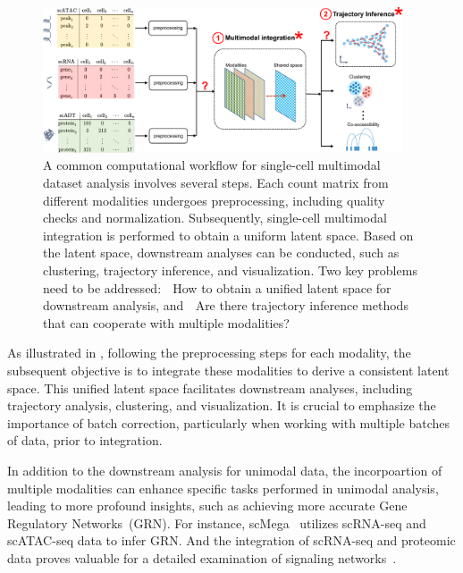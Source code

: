 \begin{figure}[!ht]
	\centering
	\includegraphics[width=0.95\textwidth]{workflow_multimodal/fig}
	\vspace{0.1cm}
	\caption[A common computational multimodal analysis workflow.]{A common computational workflow for single-cell multimodal dataset analysis involves several steps. Each count matrix from different modalities undergoes preprocessing, including quality checks and normalization. Subsequently, single-cell multimodal integration is performed to obtain a uniform latent space. Based on the latent space, downstream analyses can be conducted, such as clustering, trajectory inference, and visualization. Two key problems need to be addressed: \textcircled{} How to obtain a unified latent space for downstream analysis, and \textcircled{} Are there trajectory inference methods that can cooperate with multiple modalities?}
	\label{fig:workflow_multimodal}
\end{figure}


	As illustrated in , following the preprocessing steps for each modality, the subsequent objective is to integrate these modalities to derive a consistent latent space. This unified latent space facilitates downstream analyses, including trajectory analysis, clustering, and visualization. It is crucial to emphasize the importance of batch correction, particularly when working with multiple batches of data, prior to integration.

	In addition to the downstream analysis for unimodal data, the incorpoartion of multiple modalities can enhance specific tasks performed in unimodal analysis, leading to more profound insights, such as achieving more accurate Gene Regulatory Networks~(GRN). For instance, scMega~\citep{li2023scmega} utilizes scRNA-seq and scATAC-seq data to infer GRN. And the integration of scRNA-seq and proteomic data proves valuable for a detailed examination of signaling networks~\citep{heumos2023best}.



